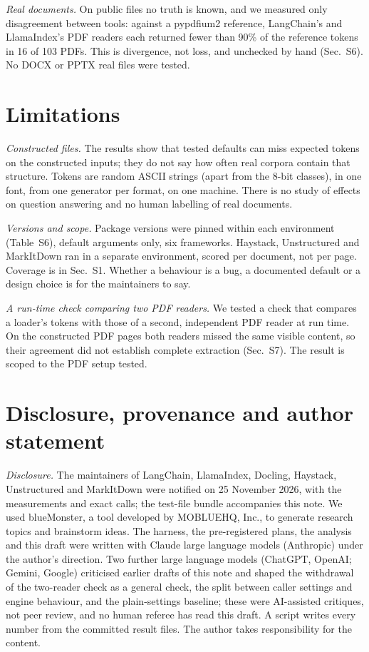 \documentclass[aps,pre,twocolumn,superscriptaddress,nofootinbib,10pt]{revtex4-2}
\begin{document}
\emph{Real documents.} On public files no truth is known, and we measured only disagreement between tools: against a pypdfium2 reference, LangChain's and LlamaIndex's PDF readers each returned fewer than 90\% of the reference tokens in 16 of 103 PDFs. This is divergence, not loss, and unchecked by hand (Sec.~S6). No DOCX or PPTX real files were tested.

\section{Limitations}
\emph{Constructed files.} The results show that tested defaults can miss expected tokens on the constructed inputs; they do not say how often real corpora contain that structure. Tokens are random ASCII strings (apart from the 8-bit classes), in one font, from one generator per format, on one machine. There is no study of effects on question answering and no human labelling of real documents.

\emph{Versions and scope.} Package versions were pinned within each environment (Table~S6), default arguments only, six frameworks. Haystack, Unstructured and MarkItDown ran in a separate environment, scored per document, not per page. Coverage is in Sec.~S1. Whether a behaviour is a bug, a documented default or a design choice is for the maintainers to say.

\emph{A run-time check comparing two PDF readers.} We tested a check that compares a loader's tokens with those of a second, independent PDF reader at run time. On the constructed PDF pages both readers missed the same visible content, so their agreement did not establish complete extraction (Sec.~S7). The result is scoped to the PDF setup tested.

\section{Disclosure, provenance and author statement}
\emph{Disclosure.} The maintainers of LangChain, LlamaIndex, Docling, Haystack, Unstructured and MarkItDown were notified on 25 November 2026, with the measurements and exact calls; the test-file bundle accompanies this note. We used blueMonster, a tool developed by MOBLUEHQ, Inc., to generate research topics and brainstorm ideas. The harness, the pre-registered plans, the analysis and this draft were written with Claude large language models (Anthropic) under the author's direction. Two further large language models (ChatGPT, OpenAI; Gemini, Google) criticised earlier drafts of this note and shaped the withdrawal of the two-reader check as a general check, the split between caller settings and engine behaviour, and the plain-settings baseline; these were AI-assisted critiques, not peer review, and no human referee has read this draft. A script writes every number from the committed result files. The author takes responsibility for the content.
\end{document}
